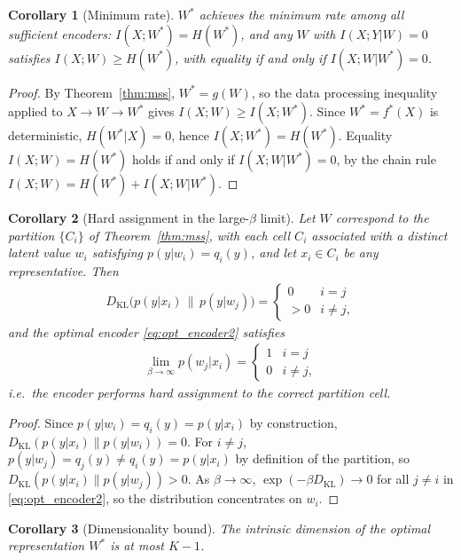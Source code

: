 \documentclass[11pt]{article}
\newtheorem{corollary}{Corollary}
\begin{document}
\begin{corollary}[Minimum rate]
\label{cor:min_rate}
$W^*$ achieves the minimum rate among all sufficient encoders:
$I(X;W^*)=H(W^*)$, and any $W$ with $I(X;Y|W)=0$ satisfies
$I(X;W)\geq H(W^*)$, with equality if and only if $I(X;W|W^*)=0$.
\end{corollary}

\begin{proof}
By Theorem~\ref{thm:mss}, $W^*=g(W)$, so the data processing
inequality applied to $X\to W\to W^*$ gives
$I(X;W)\geq I(X;W^*)$.
Since $W^*=f^*(X)$ is deterministic, $H(W^*|X)=0$, hence
$I(X;W^*)=H(W^*)$.
Equality $I(X;W)=H(W^*)$ holds if and only if $I(X;W|W^*)=0$,
by the chain rule $I(X;W)=H(W^*)+I(X;W|W^*)$.
\end{proof}

\begin{corollary}[Hard assignment in the large-$\beta$ limit]
\label{cor:hard}
Let $W$ correspond to the partition $\{C_i\}$ of Theorem~\ref{thm:mss},
with each cell $C_i$ associated with a distinct latent value $w_i$
satisfying $p(y|w_i)=q_i(y)$, and let $x_i\in C_i$ be any
representative.
Then
\begin{align}
    D_{\mathrm{KL}}\bigl(p(y|x_i)\,\|\,p(y|w_j)\bigr) =
    \begin{cases} 0 & i=j \\ >0 & i\neq j, \end{cases}
    \label{eq:kl_cases}
\end{align}
and the optimal encoder \eqref{eq:opt_encoder2} satisfies
\begin{align}
    \lim_{\beta\to\infty} p(w_j|x_i) =
    \begin{cases} 1 & i=j \\ 0 & i\neq j, \end{cases}
\end{align}
i.e.\ the encoder performs hard assignment to the correct partition cell.
\end{corollary}

\begin{proof}
Since $p(y|w_i)=q_i(y)=p(y|x_i)$ by construction,
$D_{\mathrm{KL}}(p(y|x_i)\|p(y|w_i))=0$.
For $i\neq j$, $p(y|w_j)=q_j(y)\neq q_i(y)=p(y|x_i)$ by definition
of the partition, so $D_{\mathrm{KL}}(p(y|x_i)\|p(y|w_j))>0$.
As $\beta\to\infty$, $\exp(-\beta D_{\mathrm{KL}})\to 0$ for all
$j\neq i$ in \eqref{eq:opt_encoder2}, so the distribution concentrates
on $w_i$.
\end{proof}

\begin{corollary}[Dimensionality bound]
\label{thm:dim}
The intrinsic dimension of the optimal representation $W^*$ is at
most $K-1$.
\end{corollary}
\end{document}
